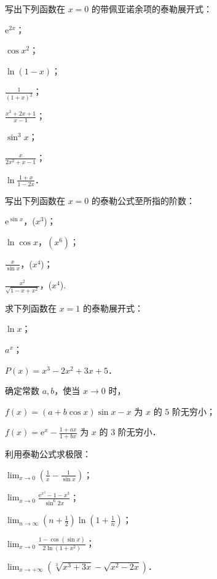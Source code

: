 \begin{xiti}
\item 写出下列函数在 $x = 0$ 的带佩亚诺余项的泰勒展开式：
\begin{ziti}
\item $\mathrm{e}^{2x}$；
\item $\cos x^2$；
\item $\ln(1-x)$；
\item $\displaystyle \frac{1}{(1+x)^2}$；
\item $\displaystyle \frac{x^3 + 2x + 1}{x - 1}$；
\item $\sin^3 x$；
\item $\displaystyle \frac{x}{2x^2 + x - 1}$；
\item $\displaystyle \ln\frac{1+x}{1-2x}$．
\end{ziti}

\item 写出下列函数在 $x = 0$ 的泰勒公式至所指的阶数：
\begin{ziti}
\item $\mathrm{e}^{\sin x}$，($x^3$)；
\item $\ln\cos x$，$ (x^6) $；
\item $\displaystyle \frac{x}{\sin x}$，($x^4$)；
\item $\displaystyle \frac{x^2}{\sqrt{1 - x + x^2}}$，($x^4$).
\end{ziti}

\item 求下列函数在 $x = 1$ 的泰勒展开式：
\begin{ziti}
\item $\ln x$；
\item $a^x$；
\item $P(x) = x^3 - 2x^2 + 3x + 5$．
\end{ziti}

\item 确定常数 $a, b$，使当 $x \to 0$ 时，
\begin{ziti}
\item $f(x) = (a + b \cos x) \sin x - x$ 为 $x$ 的 $5$ 阶无穷小；
\item $\displaystyle f(x) = \mathrm{e}^x - \frac{1 + ax}{1 + bx}$ 为 $x$ 的 $3$ 阶无穷小．
\end{ziti}

\item 利用泰勒公式求极限：
\begin{ziti}
\item $\displaystyle \lim_{x \to 0} \left( \frac{1}{x} - \frac{1}{\sin x} \right)$；
\item $\displaystyle \lim_{x \to 0} \frac{\mathrm{e}^{x^3} - 1 - x^3}{\sin^6 2x}$；
\item $\displaystyle \lim_{n\to\infty}\left(n+\frac{1}{2}\right)\ln\left(1+\frac{1}{n}\right)$；
\item $\displaystyle \lim_{x \to 0} \frac{1 - \cos(\sin x)}{2 \ln(1 + x^2)}$；
\item $\displaystyle \lim_{x \to +\infty} \left( \sqrt[3]{x^3 + 3x} - \sqrt{x^2 - 2x} \right)$．
\end{ziti}


\end{xiti}

